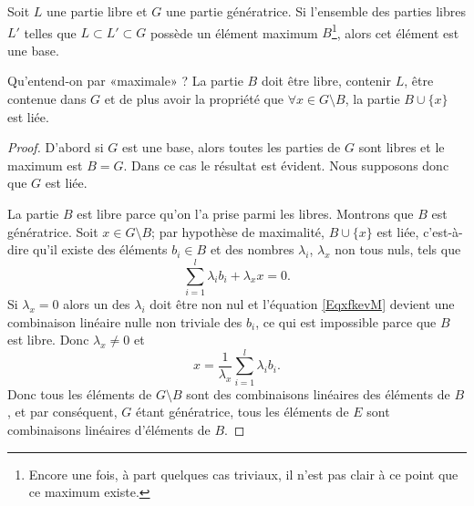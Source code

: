 \begin{lemma}   \label{LemkUfzHl}
    Soit \( L\) une partie libre et \( G\) une partie génératrice. Si l'ensemble des parties libres \( L'\) telles que \( L\subset L'\subset G\) possède un élément maximum \( B \)\footnote{Encore une fois, à part quelques cas triviaux, il n'est pas clair à ce point que ce maximum existe.}, alors cet élément est une base.
\end{lemma}
Qu'entend-on par «maximale» ? La partie \( B\) doit être libre, contenir \( L\), être contenue dans \( G\) et de plus avoir la propriété que \( \forall x\in G\setminus B\), la partie \( B\cup\{ x \}\) est liée.

\begin{proof}
    D'abord si \( G\) est une base, alors toutes les parties de \( G\) sont libres et le maximum est \( B=G\). Dans ce cas le résultat est évident. Nous supposons donc que \( G\) est liée.

    La partie \( B \) est libre parce qu'on l'a prise parmi les libres. Montrons que \( B\) est génératrice. Soit \( x\in G\setminus B\); par hypothèse de maximalité, \( B\cup\{ x \}\) est liée, c'est-à-dire qu'il existe des éléments \( b_i \in B \) et des nombres \( \lambda_i\), \( \lambda_x\) non tous nuls, tels que
    \begin{equation}    \label{EqxfkevM}
        \sum_{i=1}^l\lambda_ib_i+\lambda_xx=0.
    \end{equation}
    Si \( \lambda_x=0\) alors un des \( \lambda_i\) doit être non nul et l'équation \eqref{EqxfkevM} devient une combinaison linéaire nulle non triviale des \( b_i\), ce qui est impossible parce que \( B\) est libre. Donc \( \lambda_x\neq 0\) et
    \begin{equation}
        x=\frac{1}{ \lambda_x }\sum_{i=1}^l\lambda_ib_i.
    \end{equation}
    Donc tous les éléments de \( G\setminus B\) sont des combinaisons linéaires des éléments de \( B\), et par conséquent, \( G\) étant génératrice, tous les éléments de \( E\) sont combinaisons linéaires d'éléments de \( B\).
\end{proof}

